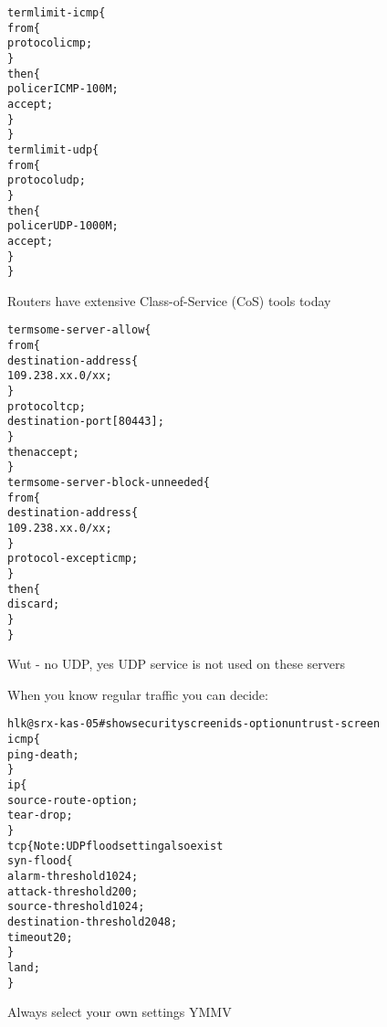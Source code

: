 \documentclass[20pt,landscape,a4paper,footrule]{foils}
\begin{document}

\begin{alltt}\footnotesize
term limit-icmp \{
    from \{
        protocol icmp;
    \}
    then \{
        policer ICMP-100M;
        accept;
    \}
\}
term limit-udp \{
    from \{
        protocol udp;
    \}
    then \{
        policer UDP-1000M;
        accept;
    \}
\}
\end{alltt}

Routers have extensive Class-of-Service (CoS) tools today


\begin{alltt}\footnotesize
term some-server-allow \{
    from \{
        destination-address \{
            109.238.xx.0/xx;
        \}
        protocol tcp;
        destination-port [ 80 443 ];
    \}
    then accept;
\}
term some-server-block-unneeded \{
    from \{
        destination-address \{
            109.238.xx.0/xx;
        \}
        protocol-except icmp;
    \}
    then \{
        discard;
    \}
\}
\end{alltt}

Wut - no UDP, yes UDP service is not used on these servers



When you know regular traffic you can decide:

\begin{alltt}\footnotesize
hlk@srx-kas-05# show security screen ids-option untrust-screen
icmp \{
    ping-death;
\}
ip \{
    source-route-option;
    tear-drop;
\}
tcp \{    Note: UDP flood setting also exist
    syn-flood \{
        alarm-threshold 1024;
        attack-threshold 200;
        source-threshold 1024;
        destination-threshold 2048;
        timeout 20;
    \}
    land;
\}
\end{alltt}

Always select your own settings YMMV
\end{document}
